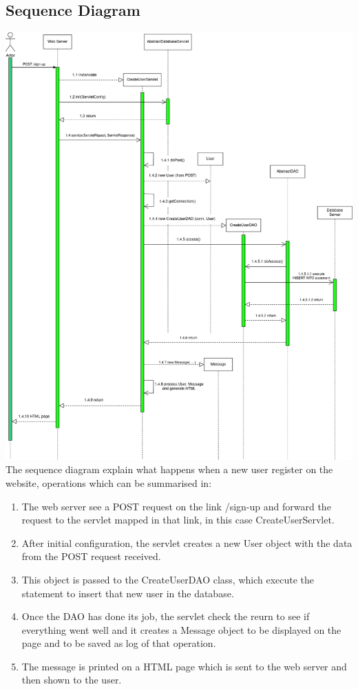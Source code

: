 \subsection{Sequence Diagram}

\includegraphics[width=0.85\linewidth]{seq_signup.png}
\newline
The sequence diagram explain what happens when a new user register on the website, operations which can be summarised in:
\begin{enumerate}
    \item The web server see a POST request on the link /sign-up and forward the request to the servlet mapped in that link, in this case CreateUserServlet.
    \item After initial configuration, the servlet creates a new User object with the data from the POST request received.
    \item This object is passed to the CreateUserDAO class, which execute the statement to insert that new user in the database.
    \item Once the DAO has done its job, the servlet check the reurn to see if everything went well and it creates a Message object to be displayed on the page and to be saved as log of that operation.
    \item The message is printed on a HTML page which is sent to the web server and then shown to the user.
\end{enumerate}

